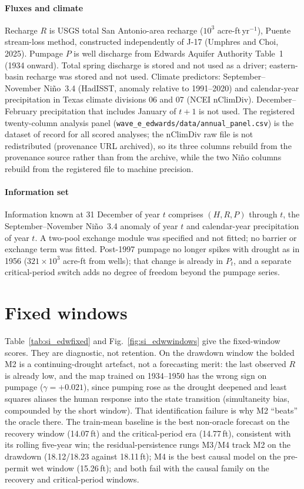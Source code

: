 \documentclass[preprint,11pt,authoryear]{elsarticle}
\theoremstyle{remark}
\begin{document}
\paragraph{Fluxes and climate} Recharge $R$ is USGS total San Antonio-area recharge ($10^3$ acre-ft\,yr$^{-1}$), Puente stream-loss method, constructed independently of J-17 (Umphres and Choi, 2025). Pumpage $P$ is well discharge from Edwards Aquifer Authority Table~1 (1934 onward). Total spring discharge is stored and not used as a driver; eastern-basin recharge was stored and not used. Climate predictors: September--November Ni\~no~3.4 (HadISST, anomaly relative to 1991--2020) and calendar-year precipitation in Texas climate divisions 06 and 07 (NCEI nClimDiv). December--February precipitation that includes January of $t+1$ is not used. The registered twenty-column analysis panel (\texttt{wave\_e\_edwards/data/annual\_panel.csv}) is the dataset of record for all scored analyses; the nClimDiv raw file is not redistributed (provenance URL archived), so its three columns rebuild from the provenance source rather than from the archive, while the two Ni\~no columns rebuild from the registered file to machine precision.

\paragraph{Information set} Information known at 31 December of year $t$ comprises $(H,R,P)$ through $t$, the September--November Ni\~no~3.4 anomaly of year $t$ and calendar-year precipitation of year $t$. A two-pool exchange module was specified and not fitted; no barrier or exchange term was fitted. Post-1997 pumpage no longer spikes with drought as in 1956 ($321\times10^3$ acre-ft from wells); that change is already in $P_t$, and a separate critical-period switch adds no degree of freedom beyond the pumpage series.

\FloatBarrier
\section{Fixed windows}\label{si:edwfixed}

Table~\ref{tab:si_edwfixed} and Fig.~\ref{fig:si_edwwindows} give the fixed-window scores. They are diagnostic, not retention. On the drawdown window the bolded M2 is a continuing-drought artefact, not a forecasting merit: the last observed $R$ is already low, and the map trained on 1934--1950 has the wrong sign on pumpage ($\gamma=+0.021$), since pumping rose as the drought deepened and least squares aliases the human response into the state transition (simultaneity bias, compounded by the short window). That identification failure is why M2 ``beats'' the oracle there. The train-mean baseline is the best non-oracle forecast on the recovery window (14.07\,ft) and the critical-period era (14.77\,ft), consistent with its rolling five-year win; the residual-persistence rungs M3/M4 track M2 on the drawdown (18.12/18.23 against 18.11\,ft); M4 is the best causal model on the pre-permit wet window (15.26\,ft); and both fail with the causal family on the recovery and critical-period windows.
\end{document}
